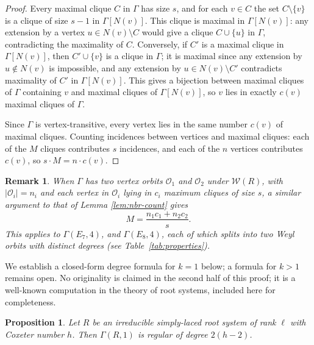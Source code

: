 \documentclass[11pt]{article}
\newtheorem{proposition}[theorem]{Proposition}
\newtheorem{remark}[theorem]{Remark}
\newcommand{\W}{\mathcal{W}}
\begin{document}
\begin{proof}
Every maximal clique $C$ in $\Gamma$ has size $s$, and for each $v \in C$ the set $C \setminus \{v\}$ is a clique of size $s-1$ in $\Gamma[N(v)]$. This clique is maximal in $\Gamma[N(v)]$: any extension by a vertex $u \in N(v) \setminus C$ would give a clique $C \cup \{u\}$ in $\Gamma$, contradicting the maximality of $C$. Conversely, if $C'$ is a maximal clique in $\Gamma[N(v)]$, then $C' \cup \{v\}$ is a clique in $\Gamma$; it is maximal since any extension by $u \notin N(v)$ is impossible, and any extension by $u \in N(v) \setminus C'$ contradicts maximality of $C'$ in $\Gamma[N(v)]$. This gives a bijection between maximal cliques of $\Gamma$ containing $v$ and maximal cliques of $\Gamma[N(v)]$, so $v$ lies in exactly $c(v)$ maximal cliques of $\Gamma$.

Since $\Gamma$ is vertex-transitive, every vertex lies in the same number $c(v)$ of maximal cliques. Counting incidences between vertices and maximal cliques: each of the $M$ cliques contributes $s$ incidences, and each of the $n$ vertices contributes $c(v)$, so $s \cdot M = n \cdot c(v)$.
\end{proof}

\begin{remark}\label{rem:two-orbit}
When $\Gamma$ has two vertex orbits $\mathcal{O}_1$ and $\mathcal{O}_2$ under $\W(R)$, with $|\mathcal{O}_i| = n_i$ and each vertex in $\mathcal{O}_i$ lying in $c_i$ maximum cliques of size $s$, a similar argument to that of Lemma \ref{lem:nbr-count} gives
\[
M = \frac{n_1 c_1 + n_2 c_2}{s}.
\]
This applies to $\Gamma(E_7, 4)$, and $\Gamma(E_8, 4)$, each of which splits into two Weyl orbits with distinct degrees (see Table~\ref{tab:properties}).
\end{remark}

We establish a closed-form degree formula for $k = 1$ below; a formula for $k > 1$ remains open. No originality is claimed in the second half of this proof; it is a well-known computation in the theory of root systems, included here for completeness. 

\begin{proposition}\label{prop:k1degree}
Let $R$ be an irreducible simply-laced root system of rank $\ell$ with Coxeter number $h$. Then $\Gamma(R, 1)$ is regular of degree $2(h - 2)$.
\end{proposition}
\end{document}
